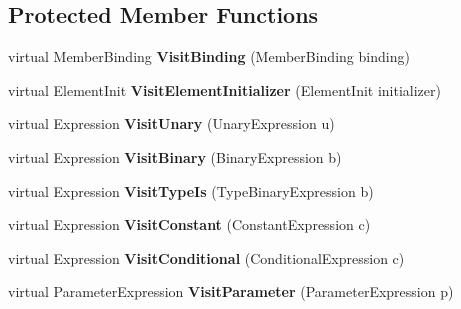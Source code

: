 \subsection*{Protected Member Functions}
\begin{DoxyCompactItemize}
\item 
\mbox{\label{class_linq_1_1_expression_tree_visitor_ad4182f3eb60ebd6cc5d92dd4f3387eba}} 
virtual Member\+Binding {\bfseries Visit\+Binding} (Member\+Binding binding)
\item 
\mbox{\label{class_linq_1_1_expression_tree_visitor_abca6f8f786bb8b81a1712577cc13360f}} 
virtual Element\+Init {\bfseries Visit\+Element\+Initializer} (Element\+Init initializer)
\item 
\mbox{\label{class_linq_1_1_expression_tree_visitor_a535750c03443cc1272c55819f5ceed44}} 
virtual Expression {\bfseries Visit\+Unary} (Unary\+Expression u)
\item 
\mbox{\label{class_linq_1_1_expression_tree_visitor_ab1a50429a5b7b0132be494e0b674cefd}} 
virtual Expression {\bfseries Visit\+Binary} (Binary\+Expression b)
\item 
\mbox{\label{class_linq_1_1_expression_tree_visitor_a6ab52ee5f1c1ba8829ecffb7c3269bb1}} 
virtual Expression {\bfseries Visit\+Type\+Is} (Type\+Binary\+Expression b)
\item 
\mbox{\label{class_linq_1_1_expression_tree_visitor_acfd867633f6bf33f304d5ca48927418d}} 
virtual Expression {\bfseries Visit\+Constant} (Constant\+Expression c)
\item 
\mbox{\label{class_linq_1_1_expression_tree_visitor_ac167f7f6ae89b8bd98b0c8a449ee5616}} 
virtual Expression {\bfseries Visit\+Conditional} (Conditional\+Expression c)
\item 
\mbox{\label{class_linq_1_1_expression_tree_visitor_ae92c721d152cde3879b4917e77b521e5}} 
virtual Parameter\+Expression {\bfseries Visit\+Parameter} (Parameter\+Expression p)

\end{DoxyCompactItemize}
